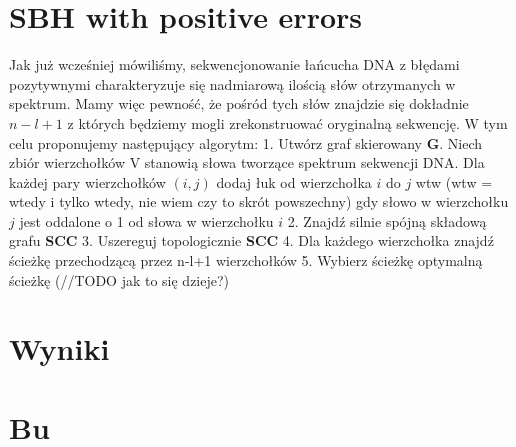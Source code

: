 \documentclass[a4paper]{article}
\begin{document}
\section{SBH with positive errors}
Jak już wcześniej mówiliśmy, sekwencjonowanie łańcucha DNA z błędami pozytywnymi charakteryzuje się nadmiarową ilością słów otrzymanych w spektrum. Mamy więc pewność, że pośród tych słów znajdzie się dokładnie $n-l+1$ z których będziemy mogli zrekonstruować oryginalną sekwencję.
W tym celu proponujemy następujący algorytm:
1. Utwórz graf skierowany {\bf G}. Niech zbiór wierzchołków V stanowią słowa tworzące spektrum sekwencji DNA. Dla każdej pary wierzchołków $(i,j)$ dodaj łuk od wierzchołka $i$ do $j$ wtw (wtw = wtedy i tylko wtedy, nie wiem czy to skrót powszechny) gdy słowo w wierzchołku $j$ jest oddalone o 1 od słowa w wierzchołku $i$
2. Znajdź silnie spójną składową grafu {\bf SCC}
3. Uszereguj topologicznie {\bf SCC}
4. Dla każdego wierzchołka znajdź ścieżkę przechodzącą przez n-l+1 wierzchołków
5. Wybierz ścieżkę optymalną ścieżkę (//TODO jak to się dzieje?) 

\section{Wyniki}

\section{Bu}
\end{document}
